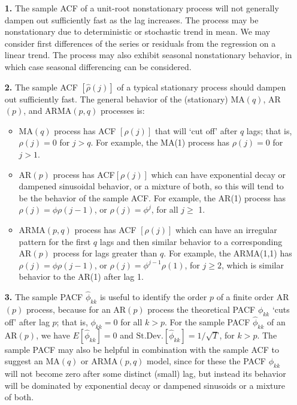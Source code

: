 \begin{enumerate}
\item[\textbf{1.}] The sample ACF of a unit-root nonstationary process will not generally dampen out sufficiently fast as the lag increases. The process may be nonstationary due to deterministic or stochastic trend in mean. We may consider first differences of the series or residuals from the regression on a linear trend. The process may also exhibit seasonal nonstationary behavior, in which case seasonal differencing can be considered. 

\item[\textbf{2.}] The sample ACF $[\hat{\rho}(j)]$ of a typical stationary process should dampen out sufficiently fast. The general behavior of the (stationary) MA$(q)$, AR$(p)$, and ARMA$(p,q)$ processes is: 

\begin{itemize}
\item MA$(q)$ process has ACF $[\rho(j)]$ that will `cut off' after $q$ lags; that is, $\rho(j) = 0$ for $j>q$. For example, the MA(1) process has $\rho(j)=0$ for $j>1$.

\item AR$(p)$ process has ACF$[\rho(j)]$ which can have exponential decay or dampened sinusoidal behavior, or a mixture of both, so this will tend to be the behavior of the sample ACF. For example, the AR(1) process has $\rho(j)=\phi \rho(j-1)$,  or $\rho(j) = \phi^j$, for all $j \geq$ 1.

\item ARMA$(p,q)$ process has ACF $[\rho(j)]$ which can have an irregular pattern for the first $q$ lags and then similar behavior to a corresponding AR$(p)$ process for lags greater than $q$. For example, the ARMA(1,1) has $\rho(j) = \phi\rho(j-1)$, or $\rho(j)=\phi^{j-1}\rho(1)$, for $j \geq 2$, which is similar behavior to the AR(1) after lag 1.
\end{itemize}

\item[\textbf{3.}] The sample PACF $\hat{\phi}_{kk}$ is useful to identify the order $p$ of a finite order AR$(p)$ process, because for an AR$(p)$ process the theoretical PACF $\phi_{kk}$ `cuts off' after lag $p$; that is, $\phi_{kk}=0$ for all $k>p$. For the sample PACF $\hat{\phi}_{kk}$ of an AR$(p)$, we have $E[\hat{\phi}_{kk}]=0$ and $\text{St.Dev.}[\hat{\phi}_{kk}]=1/\sqrt{T}$, for $k>p$. The sample PACF may also be helpful in combination with the sample ACF to suggest an MA$(q)$ or ARMA$(p,q)$ model, since for these the PACF $\phi_{kk}$ will not become zero after some distinct (small) lag, but instead its behavior will be dominated by exponential decay or dampened sinusoids or a mixture of both.
\end{enumerate}


